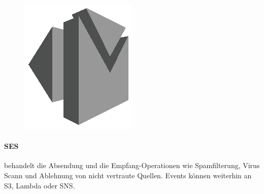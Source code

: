 \documentclass[
12pt,
english,
ngerman,
headsepline,
twoside,
openright,
numbers=noenddot,version=first
]{scrreprt}
\begin{document}
\begin{figure}
	\includegraphics[width=0.9\linewidth]{./pics/aws/Messaging_GRAYSCALE_AmazonSES.eps}
\end{figure}
\paragraph{\acrfull{SES}} behandelt die Absendung und die Empfang-Operationen wie Spamfilterung, Virus Scann und Ablehnung von nicht vertraute Quellen. Events können weiterhin an \acrshort{S3}, Lambda oder \acrshort{SNS}.
\end{document}
